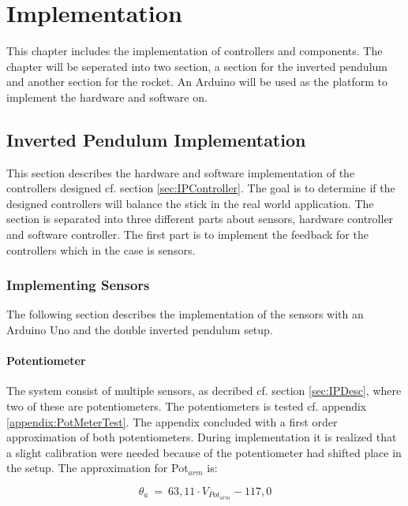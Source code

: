 \chapter{Implementation}
This chapter includes the implementation of controllers and components. The chapter will be seperated into two section, a section for the inverted pendulum and another section for the rocket. An Arduino will be used as the platform to implement the hardware and software on.    

\section{Inverted Pendulum Implementation}
This section describes the hardware and software implementation of the controllers designed cf. section \ref{sec:IPController}. The goal is to determine if the designed controllers will balance the stick in the real world application. The section is separated into three different parts about sensors, hardware controller and software controller. The first part is to implement the feedback for the controllers which in the case is sensors. 

\subsection{Implementing Sensors}
The following section describes the implementation of the sensors with an Arduino Uno and the double inverted pendulum setup.   

\subsubsection*{Potentiometer}\label{section:PotmeterImplementation}
The system consist of multiple sensors, as decribed cf. section \ref{sec:IPDesc}, where two of these are potentiometers. The potentiometers is tested cf. appendix \ref{appendix:PotMeterTest}. The appendix concluded with a first order approximation of both potentiometers. During implementation it is realized that a slight calibration were needed because of the potentiometer had shifted place in the setup. The approximation for Pot$_{arm}$ is:

\begin{equation}
\theta_a\ =\ 63,11 \cdot V_{{Pot}_{arm}} - 117,0
\end{equation}
\startexplain
\stopexplain

